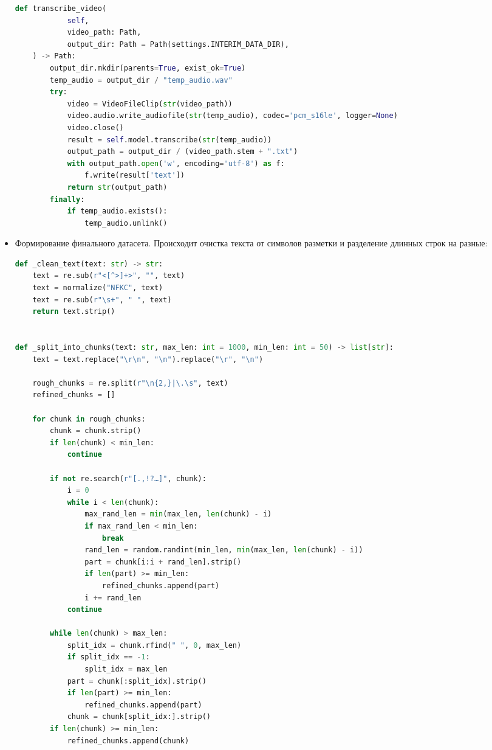 \begin{itemize}
\begin{lstlisting}[language=Python, numbers=none, frame=none]
    def transcribe_video(
            self,
            video_path: Path,
            output_dir: Path = Path(settings.INTERIM_DATA_DIR),
    ) -> Path:
        output_dir.mkdir(parents=True, exist_ok=True)
        temp_audio = output_dir / "temp_audio.wav"
        try:
            video = VideoFileClip(str(video_path))
            video.audio.write_audiofile(str(temp_audio), codec='pcm_s16le', logger=None)
            video.close()
            result = self.model.transcribe(str(temp_audio))
            output_path = output_dir / (video_path.stem + ".txt")
            with output_path.open('w', encoding='utf-8') as f:
                f.write(result['text'])
            return str(output_path)
        finally:
            if temp_audio.exists():
                temp_audio.unlink()
\end{lstlisting}
\item Формирование финального датасета. Происходит очистка текста от символов разметки и разделение длинных строк на разные:
\begin{lstlisting}[language=Python, numbers=none, frame=none]
def _clean_text(text: str) -> str:
    text = re.sub(r"<[^>]+>", "", text)
    text = normalize("NFKC", text)
    text = re.sub(r"\s+", " ", text)
    return text.strip()


def _split_into_chunks(text: str, max_len: int = 1000, min_len: int = 50) -> list[str]:
    text = text.replace("\r\n", "\n").replace("\r", "\n")

    rough_chunks = re.split(r"\n{2,}|\.\s", text)
    refined_chunks = []

    for chunk in rough_chunks:
        chunk = chunk.strip()
        if len(chunk) < min_len:
            continue

        if not re.search(r"[.,!?…]", chunk):
            i = 0
            while i < len(chunk):
                max_rand_len = min(max_len, len(chunk) - i)
                if max_rand_len < min_len:
                    break
                rand_len = random.randint(min_len, min(max_len, len(chunk) - i))
                part = chunk[i:i + rand_len].strip()
                if len(part) >= min_len:
                    refined_chunks.append(part)
                i += rand_len
            continue

        while len(chunk) > max_len:
            split_idx = chunk.rfind(" ", 0, max_len)
            if split_idx == -1:
                split_idx = max_len
            part = chunk[:split_idx].strip()
            if len(part) >= min_len:
                refined_chunks.append(part)
            chunk = chunk[split_idx:].strip()
        if len(chunk) >= min_len:
            refined_chunks.append(chunk)


\end{lstlisting}
\end{itemize}
